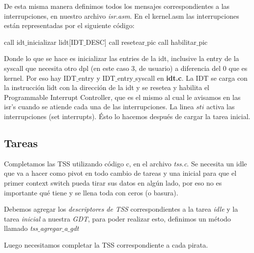 De esta misma manera definimos todos los mensajes correspondientes a las interrupciones, en nuestro archivo \textit{isr.asm}.
\newline
En el kernel.asm las interrupciones están representadas por el siguiente código:
\begin{algorithmic}
\State call idt$\_$inicializar
\State lidt[IDT$\_$DESC]
\State call resetear$\_$pic
\State call habilitar$\_$pic
\end{algorithmic}

Donde lo que se hace es inicializar las entries de la idt, inclusive la entry de la syscall que necesita otro dpl (en este caso 3, de usuario) a diferencia del 0 que es kernel. Por eso hay IDT$\_$entry y IDT$\_$entry$\_$syscall en \textbf{idt.c}. La IDT se carga con la instrucción lidt con la dirección de la idt y se resetea y habilita el Programmable Interrupt Controller, que es el mismo al cual le avisamos en las isr's cuando se atiende cada una de las interrupciones. La linea $sti$ activa las interrupciones (set interrupts). Ésto lo hacemos después de cargar la tarea inicial.
\subsection{Tareas}

Completamos las TSS utilizando c\'odigo c, en el archivo \textit{tss.c}. Se necesita un idle que va a hacer como pivot en todo cambio de tareas y una inicial para que el primer context switch pueda tirar sus datos en algún lado, por eso no es importante qué tiene y se llena toda con ceros (o basura).

Debemos agregar los \textit{descriptores de TSS} correspondientes a la tarea \textit{idle} y la tarea \textit{inicial} a nuestra \textit{GDT}, para poder realizar esto, definimos un m\'etodo llamado \textit{tss$\_$agregar$\_$a$\_$gdt}

Luego necesitamos completar la TSS correspondiente a cada pirata.

